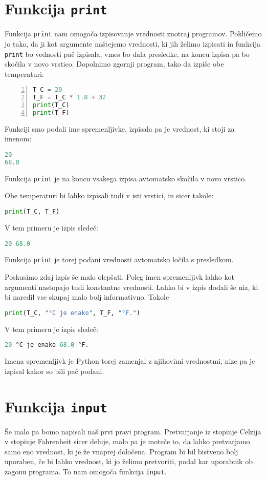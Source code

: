 \section{Funkcija \texttt{print}}
Funkcija \texttt{print} nam omogoča izpisovanje vrednosti znotraj programov. Pokličemo jo tako, da ji kot argumente naštejemo vrednosti, ki jih želimo izpisati in funkcija \texttt{print} bo vednosti pač izpisala, vmes bo dala presledke, na koncu izpisa pa bo skočila v novo vrstico. Dopolnimo zgornji program, tako da izpiše obe temperaturi:
\begin{lstlisting}[language=Python,numbers=left]
T_C = 20
T_F = T_C * 1.8 + 32
print(T_C)
print(T_F)
\end{lstlisting}
Funkciji smo podali ime spremenljivke, izpisala pa je vrednost, ki stoji za imenom:
\begin{lstlisting}[language=Python]
20
68.0
\end{lstlisting}
Funkcija \texttt{print} je na koncu vsakega izpisa avtomatsko skočila v novo vrstico.

Obe temperaturi bi lahko izpisali tudi v isti vrstici, in sicer takole:
\begin{lstlisting}[language=Python]
print(T_C, T_F)
\end{lstlisting}
V tem primeru je izpis sledeč:
\begin{lstlisting}[language=Python]
20 68.0
\end{lstlisting}
Funkcija \texttt{print} je torej podani vrednosti avtomatsko ločila s presledkom. 

Poskusimo zdaj izpis še malo olepšati. Poleg imen spremenljivk lahko kot argumenti nastopajo tudi konstantne vrednosti. Lahko bi v izpis dodali še niz, ki bi naredil vse skupaj malo bolj informativno. Takole
\begin{lstlisting}[language=Python]
print(T_C, "°C je enako", T_F, "°F.")
\end{lstlisting}
V tem primeru je izpis sledeč:
\begin{lstlisting}[language=Python]
20 °C je enako 68.0 °F.
\end{lstlisting}
Imena spremenljivk je Python torej zamenjal z njihovimi vrednostmi, nize pa je izpisal kakor so bili pač podani.

\section{Funkcija \texttt{input}}
Še malo pa bomo napisali naš prvi pravi program. Pretvarjanje iz stopinje Celzija v stopinje Fahrenheit sicer deluje, malo pa je moteče to, da lahko pretvarjamo samo eno vrednost, ki je že vnaprej določena. Program bi bil bistveno bolj uporaben, če bi lahko vrednost, ki jo želimo pretvoriti, podal kar uporabnik ob zagonu programa. To nam omogoča funkcija \texttt{input}.

